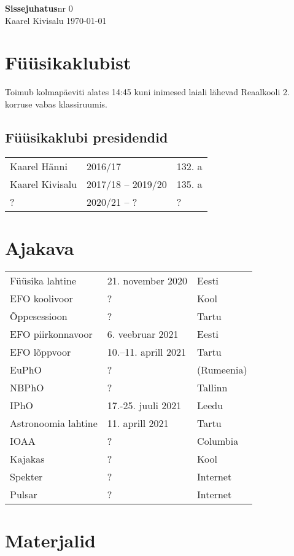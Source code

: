 \documentclass[a4paper,11pt,twocolumn]{article}
\begin{document}
{\huge \textbf{Sissejuhatus}\hfill \normalsize {nr 0}} \\
{Kaarel Kivisalu \hfill \today}

\section{Füüsikaklubist}

Toimub kolmapäeviti alates 14:45 kuni inimesed laiali lähevad Reaalkooli 2. korruse vabas klassiruumis.

\subsection{Füüsikaklubi presidendid}
\begin{tabular}{l l l}
    Kaarel Hänni & 2016/17 & 132. a \\
    Kaarel Kivisalu & 2017/18 -- 2019/20 & 135. a \\
    ? & 2020/21 -- ? & ? \\
\end{tabular}

\section{Ajakava}

\begin{tabular}{l l l}
    Füüsika lahtine & 21. november 2020 & Eesti\\
    EFO koolivoor & ? & Kool\\
    Õppesessioon & ? & Tartu \\
    EFO piirkonnavoor & 6. veebruar 2021 & Eesti\\
    EFO lõppvoor & 10.--11. aprill 2021 & Tartu\\
    EuPhO & ? & (Rumeenia)\\
    NBPhO & ? & Tallinn\\
    IPhO & 17.-25. juuli 2021 & Leedu\\
    Astronoomia lahtine & 11. aprill 2021 & Tartu\\
    IOAA & ? & Columbia\\
    Kajakas & ? & Kool\\
    Spekter & ? & Internet\\
    Pulsar & ? & Internet\\
\end{tabular}

\section{Materjalid}
\end{document}
